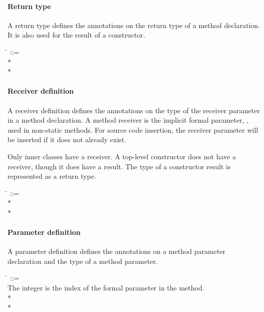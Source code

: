 \documentclass{article}
\newcommand{\code}[1]{\ifmmode{\mbox{\relax\ttfamily{#1}}}\else{\relax\ttfamily #1}\fi}
\begin{document}
\paragraph{Return type}

A return type defines the annotations on the return type of a method
declaration.  It is also used for the result of a constructor.

\begin{tabbing}
\qquad \= \kill
{} ::=  \\
\qquad    {} * \lineend \\
\qquad        {}*
\end{tabbing}


\paragraph{Receiver definition}

A receiver definition defines the annotations on the type of the receiver
parameter in a method declaration.  A method receiver is the implicit formal
parameter, \code{this}, used in non-static methods.  For source code insertion,
the receiver parameter will be inserted if it does not already exist.

Only inner classes have a receiver.  A top-level constructor does not have
a receiver, though it does have a result.  The type of a constructor result
is represented as a return type.

\begin{tabbing}
\qquad \= \kill
{} ::=  \\
\qquad    {} * \lineend \\
\qquad    {}*
\end{tabbing}


\paragraph{Parameter definition}

A parameter definition defines the annotations on a method parameter declaration
and the type of a method parameter.

\begin{tabbing}
\qquad \= \kill
{} ::= \\
\qquad    \bnfcmt The integer is the index of the formal parameter in the method. \\
\qquad    {}  \bnflit{:} * \lineend \\
\qquad    {}*
\end{tabbing}
\end{document}
